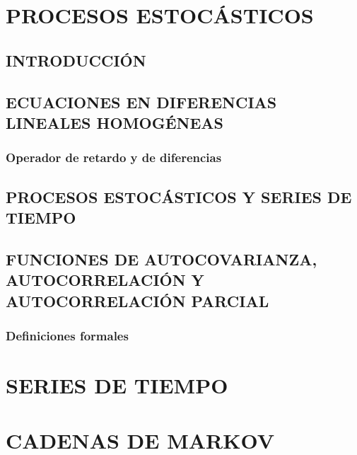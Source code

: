 
\chapter{PROCESOS ESTOCÁSTICOS}

\newpage



\section{INTRODUCCIÓN}\label{sec:intro1}
\setcounter{equation}{0}

\section{ECUACIONES EN DIFERENCIAS LINEALES HOMOGÉNEAS}\label{sec:ecuac} 
\subsection{Operador de retardo y de diferencias}

\section{PROCESOS ESTOCÁSTICOS Y SERIES DE TIEMPO}\label{sec:procestoc}

\section{FUNCIONES DE AUTOCOVARIANZA, AUTOCORRELACIÓN Y AUTOCORRELACIÓN PARCIAL}\label{sec:autovar}
\subsection{Definiciones formales}

\chapter{SERIES DE TIEMPO}
\chapter{CADENAS DE MARKOV}
